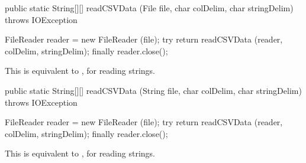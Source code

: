 \begin{code}

   public static String[][] readCSVData (File file, char colDelim,
                                         char stringDelim)
                                         throws IOException\begin{hide} {
      FileReader reader = new FileReader (file);
      try {
         return readCSVData (reader, colDelim, stringDelim);
      }
      finally {
         reader.close();
      }
   }\end{hide}
\end{code}
\begin{tabb}   This is equivalent to ,
   for reading strings.
\end{tabb}
\begin{htmlonly}
\end{htmlonly}
\begin{code}

   public static String[][] readCSVData (String file, char colDelim,
                                         char stringDelim)
                                         throws IOException\begin{hide} {
      FileReader reader = new FileReader (file);
      try {
         return readCSVData (reader, colDelim, stringDelim);
      }
      finally {
         reader.close();
      }
   }\end{hide}
\end{code}
\begin{tabb}   This is equivalent to ,
   for reading strings.
\end{tabb}
\begin{htmlonly}
\end{htmlonly}
\begin{code}\begin{hide}
}\end{hide}
\end{code}
